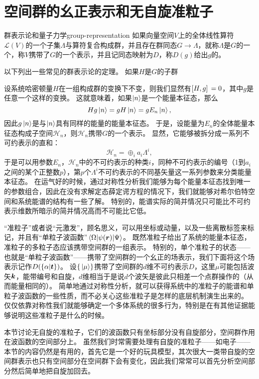 \section{空间群的幺正表示和无自旋准粒子}

\begin{back}{群表示论和量子力学}{group-representation}
    如果向量空间$V$上的全体线性算符$\mathcal{L}(V)$的一个子集$\Lambda$与算符复合构成群，并且存在群同态$G \to \Lambda$，就称$\Lambda$是$G$的一个，称$V$携带了$G$的一个表示，并且记同态映射为$D$，称$D(g)$给出$g$的。

    以下列出一些常见的群表示论的定理。
    如果$H$是$G$的子群

    设系统哈密顿量$H$在一组构成群的变换下不变，则我们显然有$\comm*{H}{g} = 0$，其中$g$是任意一个这样的变换。
    这就意味着，如果$\ket{n}$是一个能量本征态，那么
    \[
        H g \ket{n} = g H \ket{n} = g E_n \ket{n},
    \]
    因此$g \ket{n}$是与$\ket{n}$具有同样的能量的能量本征态。
    于是，设能量为$E_n$的全体能量本征态构成子空间$\mathcal{H}_n$，则$\mathcal{H}_n$携带$G$的一个表示。
    显然，它能够被拆分成一系列不可约表示的直和：
    \[
        \mathcal{H}_n = \oplus_{i} a_i \Lambda^i,
    \]
    于是可以用参数$E_n$，$\mathcal{H}_n$中的不可约表示的种类$i$，同种不可约表示的编号（1到$a_i$之间的某个正整数$p$），第$p$个$\Lambda^i$不可约表示的不同基矢量这一系列参数来分类能量本征态。
    在运气好的时候，通过对称性分析我们能够为每个能量本征态找到唯一的参数组合，因此在没有求解定态薛定谔方程的情况下，我们就能够对希尔伯特空间和系统能谱的结构有一些了解。
    特别的，能谱实际的简并情况只可能比不可约表示维数所暗示的简并情况高而不可能比它低。
\end{back}

“准粒子”或者说“元激发”，顾名思义，可以用坐标或动量，以及一些离散标签来标记，并且有“单粒子波函数”$\mel{\Omega}{\psi(\vb*{r})}{\Psi}$。
既然准粒子给出了系统的能量本征态，准粒子的多粒子态应该携带空间群的一组表示。
特别的，单个准粒子的状态——也就是“单粒子波函数”——携带了空间群的一个幺正的场表示，我们下面将这个场表示记作$D(\{\alpha | \vb*{t}\})$。
设$\{\ket*{\mu}\}$携带了空间群的$d$维不可约表示$D$，这里$\mu$可能包括波矢$\vb*{k}$，能带编号和自旋，$d$维相当于是说$d$个波矢是彼此只相差一个点群操作的（从而能量相同的）。
简单地通过对称性分析，就可以获得系统中的准粒子的能谱和单粒子波函数的一些性质，而不必关心这些准粒子是怎样的底层机制演生出来的。
仅仅依靠对称性我们就能够确定一个多体系统的很多行为，特别是在有其他证据能够说明这些准粒子是什么的时候。

本节讨论无自旋的准粒子，它们的波函数只有坐标部分没有自旋部分，空间群作用在波函数的空间部分上。
虽然我们时常需要处理有自旋的准粒子——如电子——本节的内容仍然是有用的，首先它是一个好的玩具模型，其次很大一类带自旋的空间群表示也只有空间部分在空间群下会有变化，因此我们常常可以首先分析空间部分然后简单地把自旋加回去。

